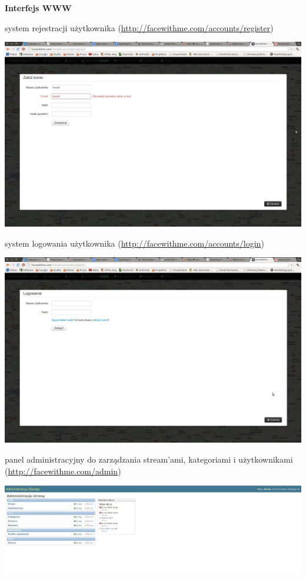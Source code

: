 \newpage
\textbf{Interfejs WWW}
\begin{packed_item}
    \item{system rejestracji użytkownika (\url{http://facewithme.com/accounts/register})
        \begin{center}
            \includegraphics[width=\textwidth]{img/screens/interfejs_www/rejestracja.jpg}
        \end{center}
    }
    \item{system logowania użytkownika (\url{http://facewithme.com/accounts/login})
        \begin{center}
            \includegraphics[width=\textwidth]{img/screens/interfejs_www/logowanie.jpg}
        \end{center}
    }
    \item{panel administracyjny do zarządzania stream'ami, kategoriami i użytkownikami (\url{http://facewithme.com/admin})
        \begin{center}
            \includegraphics[width=\textwidth]{img/screens/interfejs_www/panel-administracyjny.jpg}

\end{center}}
\end{packed_item}
